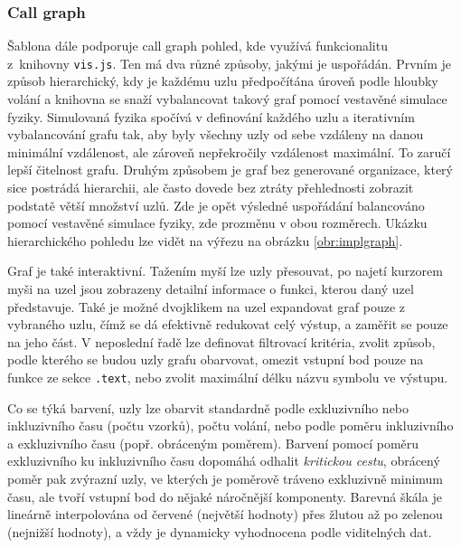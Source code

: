 \documentclass[czech,BP]{thesiskiv}
\begin{document}
\subsubsection*{Call graph}

Šablona dále podporuje call graph pohled, kde využívá funkcionalitu \\z~knihovny \texttt{vis.js}. Ten má dva různé způsoby, jakými je uspořádán. Prvním je způsob hierarchický, kdy je každému uzlu předpočítána úroveň podle hloubky volání a knihovna se snaží vybalancovat takový graf pomocí vestavěné simulace fyziky. Simulovaná fyzika spočívá v definování  každého uzlu a iterativním vybalancování grafu tak, aby byly všechny uzly od sebe vzdáleny na danou minimální vzdálenost, ale zároveň nepřekročily vzdálenost maximální. To zaručí lepší čitelnost grafu. Druhým způsobem je graf bez generované organizace, který sice postrádá hierarchii, ale často dovede bez ztráty přehlednosti zobrazit podstatě větší množství uzlů. Zde je opět výsledné uspořádání balancováno pomocí vestavěné simulace fyziky, zde prozměnu v obou rozměrech. Ukázku hierarchického pohledu lze vidět na výřezu na obrázku \ref{obr:implgraph}.

Graf je také interaktivní. Tažením myší lze uzly přesouvat, po najetí kurzorem myši na uzel jsou zobrazeny detailní informace o funkci, kterou daný uzel představuje. Také je možné dvojklikem na uzel expandovat graf pouze z vybraného uzlu, čímž se dá efektivně redukovat celý výstup, a zaměřit se pouze na jeho část. V neposlední řadě lze definovat filtrovací kritéria, zvolit způsob, podle kterého se budou uzly grafu obarvovat, omezit vstupní bod pouze na funkce ze sekce \texttt{.text}, nebo zvolit maximální délku názvu symbolu ve výstupu.

Co se týká barvení, uzly lze obarvit standardně podle exkluzivního nebo inkluzivního času (počtu vzorků), počtu volání, nebo podle poměru inkluzivního a exkluzivního času (popř. obráceným poměrem). Barvení pomocí poměru exkluzivního ku inkluzivního času dopomáhá odhalit \emph{kritickou cestu}, obrácený poměr pak zvýrazní uzly, ve kterých je poměrově tráveno exkluzivně minimum času, ale tvoří vstupní bod do nějaké náročnější komponenty. Barevná škála je lineárně interpolována od červené (největší hodnoty) přes žlutou až po zelenou (nejnižší hodnoty), a vždy je dynamicky vyhodnocena podle viditelných dat.
\end{document}
